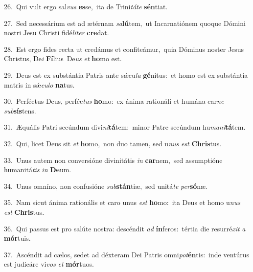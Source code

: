 {\numbfont\textcolor{\numbcolor}{26.}}~Qui vult ergo sal\textit{vus} \textbf{es}\-se,~\star ita de Trini\-\textit{tá}\-\textit{te} \textbf{sén}\-tiat.\par
{\numbfont\textcolor{\numbcolor}{27.}}~Sed necessárium est ad ætérnam \textit{sa}\-\textbf{lú}tem,~\star ut Incarnatiónem quoque Dómini nostri Jesu Christi fidé\-\textit{li}\-\textit{ter} \textbf{cre}\-dat.\par
{\numbfont\textcolor{\numbcolor}{28.}}~Est ergo fides recta ut credámus et confiteámur,~\dagger quia Dóminus noster Jesus Christus, De\textit{i} \textbf{Fí}\-lius~\star De\textit{us} \textit{et} \textbf{ho}\-mo est.\par
{\numbfont\textcolor{\numbcolor}{29.}}~Deus est ex substántia Patris ante sǽcu\textit{la} \textbf{gé}\-nitus:~\star et homo est ex substántia matris in sǽ\-\textit{cu}\-\textit{lo} \textbf{na}\-tus.\par
{\numbfont\textcolor{\numbcolor}{30.}}~Perféctus Deus, perféc\textit{tus} \textbf{ho}\-mo:~\star ex ánima rationáli et humána car\textit{ne} \textit{sub}\-\textbf{sís}tens.\par
{\numbfont\textcolor{\numbcolor}{31.}}~Æquális Patri secúndum divi\-\textit{ni}\-\textbf{tá}tem:~\star minor Patre secúndum hu\-\textit{ma}\-\textit{ni}\textbf{tá}tem.\par
{\numbfont\textcolor{\numbcolor}{32.}}~Qui, licet Deus sit \textit{et} \textbf{ho}\-mo,~\star non duo tamen, sed u\textit{nus} \textit{est} \textbf{Chris}\-tus.\par
{\numbfont\textcolor{\numbcolor}{33.}}~Unus autem non conversióne divinitátis \textit{in} \textbf{car}\-nem,~\star sed assumptióne humanitá\textit{tis} \textit{in} \textbf{De}\-um.\par
{\numbfont\textcolor{\numbcolor}{34.}}~Unus omníno, non confusióne \textit{sub}\-\textbf{stán}tiæ,~\star sed unitá\textit{te} \textit{per}\-\textbf{só}næ.\par
{\numbfont\textcolor{\numbcolor}{35.}}~Nam sicut ánima rationális et caro unus \textit{est} \textbf{ho}\-mo:~\star ita Deus et homo u\textit{nus} \textit{est} \textbf{Chris}\-tus.\par
{\numbfont\textcolor{\numbcolor}{36.}}~Qui passus est pro salúte nostra: descéndit \textit{ad} \textbf{ín}\-feros:~\star tértia die resurré\textit{xit} \textit{a} \textbf{mór}\-tuis.\par
{\numbfont\textcolor{\numbcolor}{37.}}~Ascéndit ad cælos, sedet ad déxteram Dei Patris omni\-\textit{pot}\-\textbf{én}tis:~\star inde ventúrus est judicáre vi\textit{vos} \textit{et} \textbf{mór}\-tuos.\par
